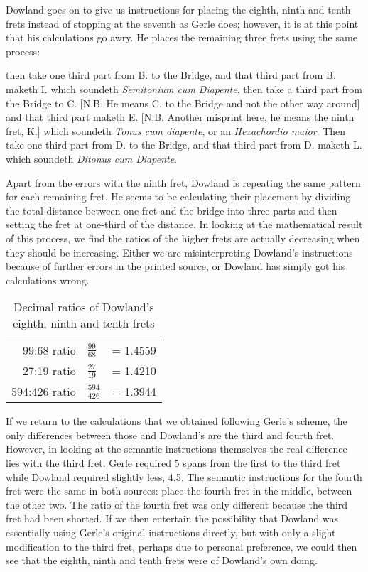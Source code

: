 Dowland goes on to give us instructions for placing the eighth, ninth and tenth frets
instead of stopping at the seventh as Gerle does; however, it is at this point that his
calculations go awry.  He places the remaining three frets using the same process:
\begin{blocks}
then take one third part from B. to the Bridge, and that third part from B. maketh I.
which soundeth \emph{Semitonium cum Diapente}, then take a third part from the Bridge
to C. [N.B. He means C. to the Bridge and not the other way around] and that third part
maketh E. [N.B. Another misprint here, he means the ninth fret, K.] which soundeth
\emph{Tonus cum diapente}, or an \emph{Hexachordio maior}.  Then take one third part
from D. to the Bridge, and that third part from D. maketh L.  which soundeth
\emph{Ditonus cum Diapente}.
\end{blocks}
Apart from the errors with the ninth fret, Dowland is repeating the same pattern for
each remaining fret.  He seems to be calculating their placement by dividing the
total distance between one fret and the bridge into three parts and then setting the
fret at one-third of the distance.  In looking at the mathematical result of
this process, we find the ratios of the higher frets are actually decreasing when they
should be increasing.  Either we are misinterpreting Dowland's instructions because of
further errors in the printed source, or Dowland has simply got his calculations wrong.

\begin{table}[h!]
    \begin{center}
    \begin{tabular}{ r l l }
        99:68 ratio   & $ \frac{99}{68}   $ &  = 1.4559 \\
        27:19 ratio   & $ \frac{27}{19}   $ &  = 1.4210 \\
        594:426 ratio & $ \frac{594}{426} $ &  = 1.3944 \\
    \end{tabular}
    \end{center}
    \caption{Decimal ratios of Dowland's eighth, ninth and tenth frets}
\end{table}

If we return to the calculations that we obtained following Gerle's scheme, the only
differences between those and Dowland's are the third and fourth fret. However, in
looking at the semantic instructions themselves the real difference lies with the third
fret.  Gerle required 5 spans from the first to the third fret while Dowland required
slightly less, 4.5.  The semantic instructions for the fourth fret were the same in
both sources: place the fourth fret in the middle, between the other two.  The ratio of
the fourth fret was only different because the third fret had been shorted.  
If we then entertain the possibility that Dowland was essentially using
Gerle's original instructions directly, but with only a slight modification to the
third fret, perhaps due to personal preference, we could then see that the eighth,
ninth and tenth frets were of Dowland's own doing.

